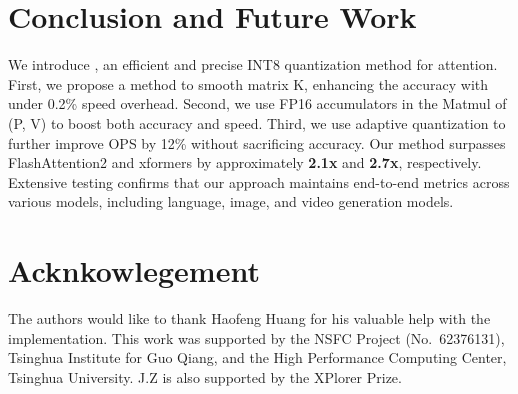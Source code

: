 \vspace{-.3em}
\section{Conclusion and Future Work}
\vspace{-.6em}
We introduce \our, an efficient and precise INT8 quantization method for attention. First, we propose a method to smooth matrix K, enhancing the accuracy with under 0.2\% speed overhead. Second, we use FP16 accumulators in the Matmul of (P, V) to boost both accuracy and speed. Third, we use adaptive quantization to further improve OPS by 12\% without sacrificing accuracy. Our method surpasses FlashAttention2 and xformers by approximately \textbf{2.1x} and \textbf{2.7x}, respectively. Extensive testing confirms that our approach maintains end-to-end metrics across various models, including language, image, and video generation models. 











\section*{Acknkowlegement}
The authors would like to thank Haofeng Huang for his valuable help with the implementation. 
This work was supported by the NSFC Project (No.~62376131), Tsinghua Institute for Guo Qiang, and the High Performance Computing Center, Tsinghua University. J.Z is also supported by the XPlorer Prize.